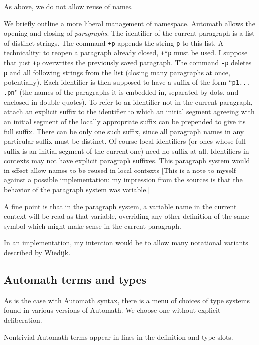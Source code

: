 \documentclass[12pt]{article}
\begin{document}
As above, we do not allow reuse of names.

We briefly outline a more liberal management of namespace.   Automath allows the opening and closing of {\em paragraphs}.  The identifier of the current paragraph is a list
of distinct strings.  The command {\tt +p} appends the string {\tt p} to this list.   A technicality:  to reopen a paragraph already closed, {\tt +*p} must be used.  I suppose that just {\tt +p} overwrites the previously saved paragraph.  The command {\tt -p} deletes {\tt p} and all following strings from the list (closing many
paragraphs at once, potentially).  Each identifier is then supposed to have a suffix of the form ``{\tt p1... .pn}" (the names of the paragraphs it is embedded in, separated by dots, and enclosed in double quotes).   To refer to an identifier not in the current paragraph, attach an explicit suffix to the identifier to which  an initial segment agreeing with an initial segment of the locally appropriate suffix can be prepended to give its full suffix.  There can be only one such suffix, since all paragraph names in any particular suffix must be distinct.   Of course local identifiers (or ones whose full suffix is an initial segment of the current one) need no suffix
at all.  Identifiers in contexts may not have explicit paragraph suffixes.  This paragraph system would in effect allow names to be reused in local contexts [This is a note to myself against a possible implementation:  my impression from the sources is that the behavior of the paragraph system was variable.]

A fine point is that in the paragraph system, a variable name in the current context will be read as that variable, overriding any other definition of the same symbol which might make sense in the current paragraph.

In an implementation, my intention would be to allow many notational variants described by Wiedijk.

\newpage

\subsection{Automath terms and types}

As is the case with Automath syntax, there is a menu of choices of type systems found in various versions of Automath.  We choose one without explicit deliberation.

Nontrivial Automath terms appear in lines in the definition and type slots.
\end{document}
